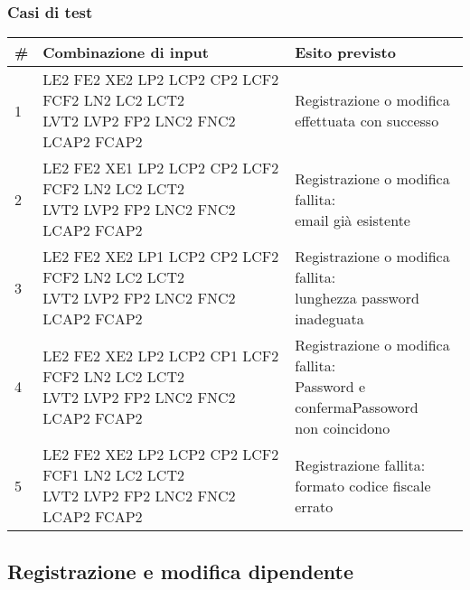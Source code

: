 \documentclass[12pt]{article}
\begin{document}
\subsubsection{Casi di test}
\begin{center}
\begin{tabular}{|l|l|l|}
\hline
\rowcolor[HTML]{C0C0C0} \textbf{\#} & \textbf{Combinazione di input} & \textbf{Esito previsto}  \\ \hline
1 & \makecell{LE2 FE2 XE2 LP2 LCP2 CP2 LCF2 FCF2 LN2 LC2 LCT2\\ LVT2 LVP2 FP2 LNC2 FNC2 LCAP2 FCAP2} & \makecell{Registrazione o modifica \\ effettuata con successo} \\ \hline
2 & \makecell{LE2 FE2 XE1 LP2 LCP2 CP2 LCF2 FCF2 LN2 LC2 LCT2\\ LVT2 LVP2 FP2 LNC2 FNC2 LCAP2 FCAP2}  & \makecell{Registrazione o modifica fallita:\\ email già esistente} \\ \hline
3 & \makecell{LE2 FE2 XE2 LP1 LCP2 CP2 LCF2 FCF2 LN2 LC2 LCT2\\ LVT2 LVP2 FP2 LNC2 FNC2 LCAP2 FCAP2}  & \makecell{Registrazione o modifica fallita:\\ lunghezza password inadeguata} \\ \hline
4 &\makecell{LE2 FE2 XE2 LP2 LCP2 CP1 LCF2 FCF2 LN2 LC2 LCT2\\ LVT2 LVP2 FP2 LNC2 FNC2 LCAP2 FCAP2}  & \makecell{ Registrazione o modifica fallita:\\ Password e confermaPassoword \\ non coincidono} \\ \hline
5 & \makecell{LE2 FE2 XE2 LP2 LCP2 CP2 LCF2 FCF1 LN2 LC2 LCT2\\ LVT2 LVP2 FP2 LNC2 FNC2 LCAP2 FCAP2}  & \makecell{Registrazione fallita:\\ formato codice fiscale errato} \\ \hline
\end{tabular}
\end{center}

\newpage

\subsection{Registrazione e modifica dipendente}
\end{document}
